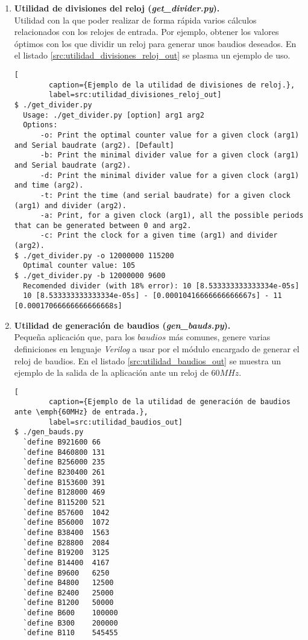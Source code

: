 \begin{enumerate}
    \item \textbf{Utilidad de divisiones del reloj (\emph{get\_divider.py}).} \\
    Utilidad con la que poder realizar de forma rápida varios cálculos relacionados con los relojes de entrada. Por ejemplo, obtener los valores óptimos con los que dividir un reloj para generar unos baudios deseados. En el listado \ref{src:utilidad_divisiones_reloj_out} se plasma un ejemplo de uso.
    \begin{lstlisting}[
        caption={Ejemplo de la utilidad de divisiones de reloj.},
        label=src:utilidad_divisiones_reloj_out]
$ ./get_divider.py
  Usage: ./get_divider.py [option] arg1 arg2
  Options: 
      -o: Print the optimal counter value for a given clock (arg1) and Serial baudrate (arg2). [Default]
      -b: Print the minimal divider value for a given clock (arg1) and Serial baudrate (arg2).
      -d: Print the minimal divider value for a given clock (arg1) and time (arg2).
      -t: Print the time (and serial baudrate) for a given clock (arg1) and divider (arg2).
      -a: Print, for a given clock (arg1), all the possible periods that can be generated between 0 and arg2.
      -c: Print the clock for a given time (arg1) and divider (arg2).
$ ./get_divider.py -o 12000000 115200
  Optimal counter value: 105
$ ./get_divider.py -b 12000000 9600
  Recomended divider (with 18% error): 10 [8.533333333333334e-05s]
  10 [8.533333333333334e-05s] - [0.00010416666666666667s] - 11 [0.00017066666666666668s]          
    \end{lstlisting}
    
    \item \textbf{Utilidad de generación de baudios (\emph{gen\_bauds.py}).} \\
    Pequeña aplicación que, para los $baudios$ más comunes, genere varias definiciones en lenguaje \emph{Verilog} a usar por el módulo encargado de generar el reloj de baudios. En el listado \ref{src:utilidad_baudios_out} se muestra un ejemplo de la salida de la aplicación ante un reloj de $60MHz$.
    \begin{lstlisting}[
        caption={Ejemplo de la utilidad de generación de baudios ante \emph{60MHz} de entrada.},
        label=src:utilidad_baudios_out]
$ ./gen_bauds.py
  `define B921600 66
  `define B460800 131
  `define B256000 235
  `define B230400 261
  `define B153600 391
  `define B128000 469
  `define B115200 521
  `define B57600  1042
  `define B56000  1072
  `define B38400  1563
  `define B28800  2084
  `define B19200  3125
  `define B14400  4167
  `define B9600   6250
  `define B4800   12500
  `define B2400   25000
  `define B1200   50000
  `define B600    100000
  `define B300    200000
  `define B110    545455
    \end{lstlisting}
    

\end{enumerate}
